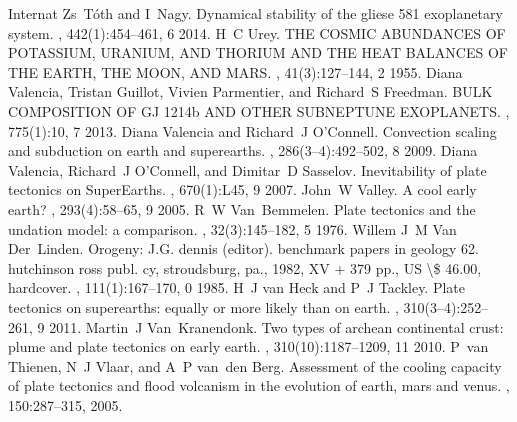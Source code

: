 \documentclass[letterpaper,10pt,english]{jupyterBook}
\begin{document}
\begin{sphinxthebibliography}{Internat}
\sphinxAtStartPar
Zs Tóth and I Nagy. Dynamical stability of the gliese 581 exoplanetary system. , 442(1):454–461, 6 2014.
\sphinxAtStartPar
H C Urey. THE COSMIC ABUNDANCES OF POTASSIUM, URANIUM, AND THORIUM AND THE HEAT BALANCES OF THE EARTH, THE MOON, AND MARS. , 41(3):127–144, 2 1955.
\sphinxAtStartPar
Diana Valencia, Tristan Guillot, Vivien Parmentier, and Richard S Freedman. BULK COMPOSITION OF GJ 1214b AND OTHER SUB\sphinxhyphen{}NEPTUNE EXOPLANETS. , 775(1):10, 7 2013.
\sphinxAtStartPar
Diana Valencia and Richard J O'Connell. Convection scaling and subduction on earth and super\sphinxhyphen{}earths. , 286(3–4):492–502, 8 2009.
\sphinxAtStartPar
Diana Valencia, Richard J O'Connell, and Dimitar D Sasselov. Inevitability of plate tectonics on Super\sphinxhyphen{}Earths. , 670(1):L45, 9 2007.
\sphinxAtStartPar
John W Valley. A cool early earth? , 293(4):58–65, 9 2005.
\sphinxAtStartPar
R W Van Bemmelen. Plate tectonics and the undation model: a comparison. , 32(3):145–182, 5 1976.
\sphinxAtStartPar
Willem J M Van Der Linden. Orogeny: J.G. dennis (editor). benchmark papers in geology 62. hutchinson ross publ. cy, stroudsburg, pa., 1982, XV + 379 pp., US \textbackslash{}\$ 46.00, hardcover. , 111(1):167–170, 0 1985.
\sphinxAtStartPar
H J van Heck and P J Tackley. Plate tectonics on super\sphinxhyphen{}earths: equally or more likely than on earth. , 310(3–4):252–261, 9 2011.
\sphinxAtStartPar
Martin J Van Kranendonk. Two types of archean continental crust: plume and plate tectonics on early earth. , 310(10):1187–1209, 11 2010.
\sphinxAtStartPar
P van Thienen, N J Vlaar, and A P van den Berg. Assessment of the cooling capacity of plate tectonics and flood volcanism in the evolution of earth, mars and venus. , 150:287–315, 2005.

\end{sphinxthebibliography}
\end{document}
